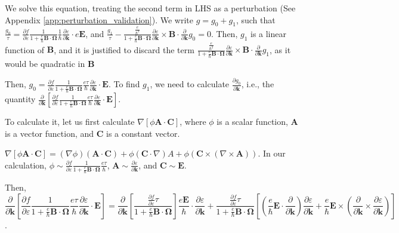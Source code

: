 \documentclass[aps,amsmath,prl]{revtex4-2}
\newcommand{\bvec}[1]{{\mathbf #1}}
\begin{document}
We solve this equation, treating the second term in LHS as a perturbation (See Appendix \ref{app:perturbation_validation}).
We write $g = g_0 + g_1$, such that $\frac{g_0}{\tau} = \frac{\partial f}{\partial \varepsilon}\frac{1}{1 + \frac{e}{\hbar} \bvec{B}\cdot\bvec{\Omega}}
\frac{1}{\hbar} \frac{\partial \varepsilon}{\partial \bvec{k}}\cdot e \bvec{E}$, and $\frac{g_1}{\tau} -\frac{\frac{e}{\hbar^2} }{1 + \frac{e}{\hbar} \bvec{B}\cdot\bvec{\Omega}} \frac{\partial \varepsilon}{\partial \bvec{k}} \times \bvec{B} \cdot\frac{\partial}{\partial \bvec{k}} g_0 = 0$.
Then, $g_1$ is a linear function of $\bvec{B}$, and it is justified to discard the term $\frac{\frac{e}{\hbar^2} }{1 + \frac{e}{\hbar} \bvec{B}\cdot\bvec{\Omega}} \frac{\partial \varepsilon}{\partial \bvec{k}} \times \bvec{B} \cdot\frac{\partial}{\partial \bvec{k}} g_1$, as it would be quadratic in $\bvec{B}$


Then, ${g_0} = \frac{\partial f} {\partial \varepsilon}\frac{1}{1 + \frac{e}{\hbar} \bvec{B}\cdot\bvec{\Omega}}
\frac{e \tau}{\hbar} \frac{\partial \varepsilon}{\partial \bvec{k}}\cdot \bvec{E}$. To find $g_1$, we need to calculate $\frac{\partial g_0}{\partial \bvec{k}}$, i.e., the quantity 
$\frac{\partial}{\partial \bvec{k}} \left[ \frac{\partial f} {\partial \varepsilon}\frac{1}{1 + \frac{e}{\hbar} \bvec{B}\cdot\bvec{\Omega}}
\frac{e \tau}{\hbar} \frac{\partial \varepsilon}{\partial \bvec{k}}\cdot \bvec{E} \right]$.

To calculate it, let us first calculate $\nabla \left[\phi \bvec{A}\cdot\bvec{C}\right]$, where $\phi$ is a scalar function, $\bvec{A}$ is a vector function, and $\bvec{C}$ is a constant vector.

$\nabla \left[\phi \bvec{A}\cdot\bvec{C}\right] = (\nabla \phi) (\bvec{A}\cdot\bvec{C}) + \phi (\bvec{C}\cdot \nabla){A} + \phi (\bvec{C}\times(\nabla\times\bvec{A})) $. In our calculation, $\phi \sim \frac{\partial f} {\partial \varepsilon}\frac{1}{1 + \frac{e}{\hbar} \bvec{B}\cdot\bvec{\Omega}}
\frac{e \tau}{\hbar}$, $\bvec{A} \sim \frac{\partial \varepsilon}{\partial \bvec{k}}$, and $\bvec{C} \sim \bvec{E}$.

Then, $$\frac{\partial}{\partial \bvec{k}} \left[ \frac{\partial f} {\partial \varepsilon}\frac{1}{1 + \frac{e}{\hbar} \bvec{B}\cdot\bvec{\Omega}}
\frac{e \tau}{\hbar} \frac{\partial \varepsilon}{\partial \bvec{k}}\cdot \bvec{E} \right] = \frac{\partial}{\partial \bvec{k}} \left[ \frac{\frac{\partial f} {\partial \varepsilon} \tau}{1 + \frac{e}{\hbar} \bvec{B}\cdot\bvec{\Omega}}
 \right] \frac{e \bvec{E}}{\hbar} \cdot \frac{\partial \varepsilon}{\partial \bvec{k}} + \frac{\frac{\partial f} {\partial \varepsilon} \tau}{1 + \frac{e}{\hbar} \bvec{B}\cdot\bvec{\Omega}} \left[(\frac{e}{\hbar} \bvec{E}\cdot \frac{\partial }{\partial \bvec{k}} )\frac{\partial \varepsilon}{\partial \bvec{k}} + \frac{e}{\hbar} \bvec{E}\times (\frac{\partial }{\partial \bvec{k}} \times \frac{\partial \varepsilon}{\partial \bvec{k}}) \right]$$.
 
\end{document}
